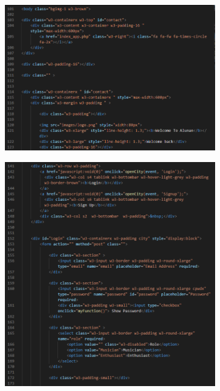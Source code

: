 \begin{enumerate}[1.]
\begin{figure}[h]
\begin{subfigure}[b]{0.7\textwidth}
            \centering
            \includegraphics[width=\textwidth]{mainmatter/images/frontend/code/loginsignup.png}
            \label{fig:sub1}
        \end{subfigure}
        \hspace{0.05\textwidth}
        \begin{subfigure}[b]{0.8\textwidth}
            \centering
            \includegraphics[width=\textwidth]{mainmatter/images/frontend/code/loginsignup2.png}

\end{subfigure}
\end{figure}
\end{enumerate}
